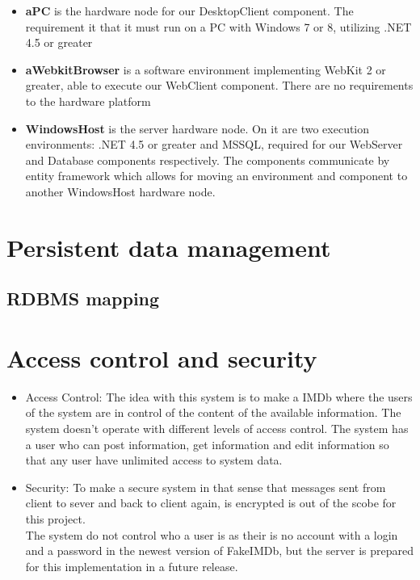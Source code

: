 \begin{itemize}
\item \textbf{aPC} is the hardware node for our DesktopClient component. The requirement it that it must run on a PC with Windows 7 or 8, utilizing .NET 4.5 or greater
\item \textbf{aWebkitBrowser} is a software environment implementing WebKit 2 or greater, able to execute our WebClient component. There are no requirements to the hardware platform
\item \textbf{WindowsHost} is the server hardware node. On it are two execution environments: .NET 4.5 or greater and MSSQL, required for our WebServer and Database components respectively. The components communicate by entity framework which allows for moving an environment and component to another WindowsHost hardware node.
\end{itemize}

\section{Persistent data management}

\subsection{RDBMS mapping}

\section{Access control and security}
\begin{itemize}
\item Access Control: The idea with this system is to make a IMDb where the users of the system are in control of the content of the available information. The system doesn't operate with different levels of access control. The system has a user who can post information, get information and edit information so that any user have unlimited access to system data.
\item Security: To make a secure system in that sense that messages sent from client to sever and back to client again, is encrypted is out of the scobe for this project.\\
The system do not control who a user is as their is no account with a login and a password in the newest version of FakeIMDb, but the server is prepared for this implementation in a future release.
\end{itemize}

